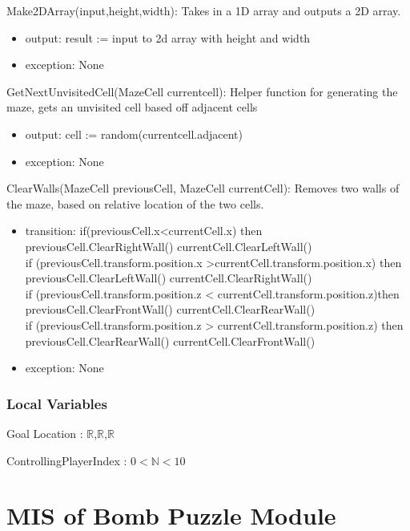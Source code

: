 \documentclass[12pt, titlepage]{article}
\begin{document}
\noindent Make2DArray(input,height,width): Takes in a 1D array and outputs a 2D array.
\begin{itemize}
    \item output: result := input to 2d array with height and width
    \item exception: None
\end{itemize}

\noindent GetNextUnvisitedCell(MazeCell currentcell): Helper function for generating the maze, gets an unvisited cell based off adjacent cells
\begin{itemize}
    \item output: cell := random(currentcell.adjacent)
    \item exception: None
\end{itemize}

\noindent ClearWalls(MazeCell previousCell, MazeCell currentCell): Removes two walls of the maze, based on relative location of the two cells.
\begin{itemize}
    \item transition: if(previousCell.x<currentCell.x) then previousCell.ClearRightWall() currentCell.ClearLeftWall()\\
    if (previousCell.transform.position.x >currentCell.transform.position.x) then previousCell.ClearLeftWall() currentCell.ClearRightWall()\\
    if (previousCell.transform.position.z < currentCell.transform.position.z)then  previousCell.ClearFrontWall() currentCell.ClearRearWall()\\
    if (previousCell.transform.position.z > currentCell.transform.position.z) then previousCell.ClearRearWall() currentCell.ClearFrontWall()
    \item exception: None
\end{itemize}


\subsubsection{Local Variables}

Goal Location : {$\mathbb{R}$,$\mathbb{R}$,$\mathbb{R}$}

\noindent ControllingPlayerIndex : $0<\mathbb{N}<10$

\newpage

\section{MIS of Bomb Puzzle Module} \label{sec:Combination} 
\end{document}
